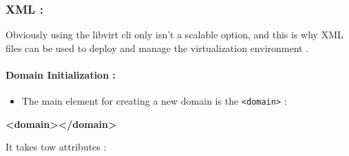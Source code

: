 \documentclass[
  14pt,
  english,
  a4paper,
]{scrreprt}
\newenvironment{Shaded}{}{}
\newcommand{\KeywordTok}[1]{\textcolor[rgb]{0.00,0.44,0.13}{\textbf{#1}}}
\providecommand{\tightlist}{%
  \setlength{\itemsep}{0pt}\setlength{\parskip}{0pt}}
\begin{document}
\hypertarget{xml}{%
\subsubsection{XML :}\label{xml}}

Obviously using the libvirt cli only isn't a scalable option, and this
is why XML files can be used to deploy and manage the virtualization
environment .

\hypertarget{domain-initialization}{%
\paragraph*{Domain Initialization :}\label{domain-initialization}}

\begin{itemize}
\tightlist
\item
  The main element for creating a new domain is the
  \texttt{\textless{}domain\textgreater{}} :
\end{itemize}

\begin{Shaded}
\begin{Highlighting}[]
\KeywordTok{\textless{}domain\textgreater{}\textless{}/domain\textgreater{}}
\end{Highlighting}
\end{Shaded}

It takes tow attributes :
\end{document}
